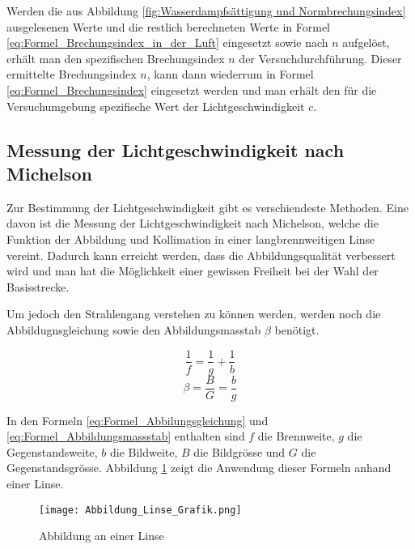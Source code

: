 Werden die aus Abbildung \ref{fig:Wasserdampfsättigung und Normbrechungsindex} ausgelesenen Werte und die restlich berechneten Werte in Formel \ref{eq:Formel_Brechungsindex_in_der_Luft} eingesetzt sowie nach $n$ aufgelöst, erhält man den spezifischen Brechungsindex $n$ der Versuchdurchführung. Dieser ermittelte Brechungsindex $n$, kann dann wiederrum in Formel \ref{eq:Formel_Brechungsindex} eingesetzt werden und man erhält den für die Versuchumgebung spezifische Wert der Lichtgeschwindigkeit $c$. 

\subsection{Messung der Lichtgeschwindigkeit nach Michelson}

Zur Bestimmung der Lichtgeschwindigkeit gibt es verschiendeste Methoden. Eine davon ist die Messung der Lichtgeschwindigkeit nach Michelson, welche die Funktion der Abbildung und Kollimation in einer langbrennweitigen Linse vereint. Dadurch kann erreicht werden, dass die Abbildungsqualität verbessert wird und man hat die Möglichkeit einer gewissen Freiheit bei der Wahl der Basisstrecke.

Um jedoch den Strahlengang verstehen zu können werden, werden noch die Abbildugnsgleichung sowie den Abbildungsmasstab $\beta$ benötigt.

\begin{equation}
\dfrac{1}{f} = \dfrac{1}{g} + \dfrac{1}{b}
\label{eq:Formel_Abbilungsgleichung}
\end{equation}
\begin{equation}
\beta = \frac{B}{G} = \frac{b}{g}
\label{eq:Formel_Abbildungsmassstab}
\end{equation}

In den Formeln \ref{eq:Formel_Abbilungsgleichung} und \ref{eq:Formel_Abbildungsmassstab} enthalten sind $f$ die Brennweite, $g$ die Gegenstandsweite, $b$ die Bildweite, $B$ die Bildgrösse und $G$ die Gegenstandsgrösse. Abbildung \ref{fig:Abbildung an einer Linse} zeigt die Anwendung dieser Formeln anhand einer Linse.

\begin{figure}[htb]
\texttt{[image: Abbildung\_Linse\_Grafik.png]}
\caption{Abbildung an einer Linse}
\label{fig:Abbildung an einer Linse}
\end{figure}

